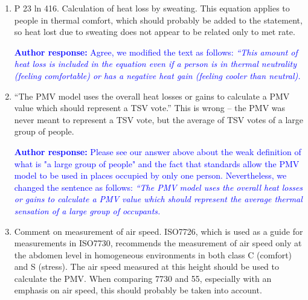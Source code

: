 \documentclass[a4paper, 10pt]{letter}
\newcommand{\response}[1]{\textcolor{blue}{\textbf{Author response:} #1}}
\begin{document}
\begin{letter}
\begin{enumerate}
            \response{
                We apologize for the mistake.
                We have revised the sentence to clarify this point and now reads as follows: \textit{``Additionally, the PMV model erroneously assumes that the human body is not capable of maintaining a stable core temperature.
                A \ac{pmv} value higher than \num{.5} or lower than \num{-.5} indicates that the hypothetical cylinder representing the human body is either gaining or losing heat, and consequently, it is getting warmer or colder, respectively.
                }
            }

            \item P 23 ln 416.
            Calculation of heat loss by sweating.
            This equation applies to people in thermal comfort, which should probably be added to the statement, so heat lost due to sweating does not appear to be related only to met rate.

            \response{Agree, we modified the text as follows: \textit{``This amount of heat loss is included in the equation even if a person is in thermal neutrality (feeling comfortable) or has a negative heat gain (feeling cooler than neutral).}}

            \item ``The PMV model uses the overall heat losses or gains to calculate a PMV value which should represent a TSV vote.'' This is wrong -- the PMV was never meant to represent a TSV vote, but the average of TSV votes of a large group of people.

            \response{
                Please see our answer above about the weak definition of what is "a large group of people" and the fact that standards allow the PMV model to be used in places occupied by only one person. 
                Nevertheless, we changed the sentence as follows: \textit{``The PMV model uses the overall heat losses or gains to calculate a PMV value which should represent the average thermal sensation of a large group of occupants.}
            }

            \item Comment on measurement of air speed.
            ISO7726, which is used as a guide for measurements in ISO7730, recommends the measurement of air speed only at the abdomen level in homogeneous environments in both class C (comfort) and S (stress).
            The air speed measured at this height should be used to calculate the PMV\@.
            When comparing 7730 and 55, especially with an emphasis on air speed, this should probably be taken into account.


\end{enumerate}
\end{letter}
\end{document}
